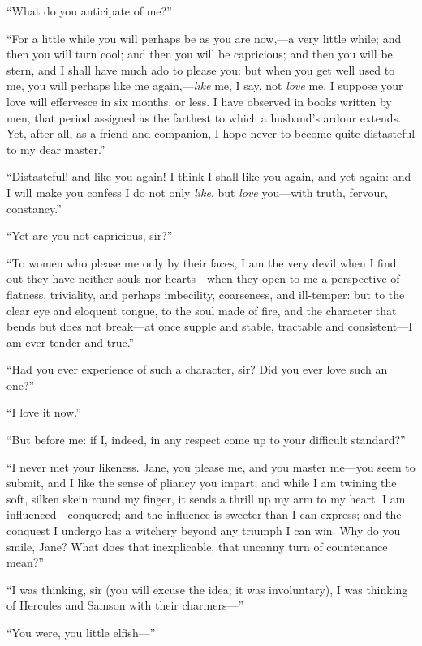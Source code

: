 \enquote{What do you anticipate of me?}

\enquote{For a little while you will perhaps be as you are now,---a very little
while; and then you will turn cool; and then you will be capricious; and
then you will be stern, and I shall have much ado to please you: but
when you get well used to me, you will perhaps like me
again,---\emph{like} me, I say, not \emph{love} me.  I suppose your love
will effervesce in six months, or less.  I have observed in books
written by men, that period assigned as the farthest to which a
husband's ardour extends.  Yet, after all, as a friend and companion, I
hope never to become quite distasteful to my dear master.}

\enquote{Distasteful! and like you again!  I think I shall like you again, and
yet again: and I will make you confess I do not only \emph{like}, but
\emph{love} you---with truth, fervour, constancy.}

\enquote{Yet are you not capricious, sir?}

\enquote{To women who please me only by their faces, I am the very devil
when I find out they have neither souls nor hearts---when they open to
me a perspective of flatness, triviality, and perhaps imbecility,
coarseness, and ill-temper: but to the clear eye and eloquent tongue, to
the soul made of fire, and the character that bends but does not
break---at once supple and stable, tractable and consistent---I am ever
tender and true.}

\enquote{Had you ever experience of such a character, sir?  Did you ever
love such an one?}

\enquote{I love it now.}

\enquote{But before me: if I, indeed, in any respect come up to your
difficult standard?}

\enquote{I never met your likeness.  Jane, you please me, and you master
me---you seem to submit, and I like the sense of pliancy you impart; and
while I am twining the soft, silken skein round my finger, it sends a
thrill up my arm to my heart.  I am influenced---conquered; and the
influence is sweeter than I can express; and the conquest I undergo has
a witchery beyond any triumph I can win.  Why do you smile, Jane?  What
does that inexplicable, that uncanny turn of countenance mean?}

\enquote{I was thinking, sir (you will excuse the idea; it was
involuntary), I was thinking of Hercules and Samson with their
charmers---}

\enquote{You were, you little elfish---}

